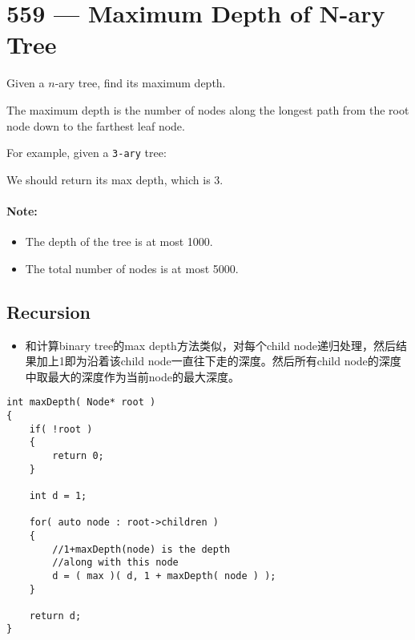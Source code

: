 \section{559 --- Maximum Depth of N-ary Tree}
Given a $n$-ary tree, find its maximum depth.

The maximum depth is the number of nodes along the longest path from the root node down to the farthest leaf node.

For example, given a \texttt{3-ary} tree:

 
\begin{figure}[H]
\end{figure}

 

We should return its max depth, which is 3.

 

\paragraph{Note:}

\begin{itemize}
\item The depth of the tree is at most 1000.
\item The total number of nodes is at most 5000.
\end{itemize}

\subsection{Recursion}
\begin{itemize}
\item 和计算binary tree的max depth方法类似，对每个child node递归处理，然后结果加上1即为沿着该child node一直往下走的深度。然后所有child node的深度中取最大的深度作为当前node的最大深度。
\end{itemize}

\setcounter{lstlisting}{0}
\begin{lstlisting}[style=customc, caption={Recursion}]
int maxDepth( Node* root )
{
    if( !root )
    {
        return 0;
    }

    int d = 1;

    for( auto node : root->children )
    {
        //1+maxDepth(node) is the depth
        //along with this node
        d = ( max )( d, 1 + maxDepth( node ) );
    }

    return d;
}
\end{lstlisting}